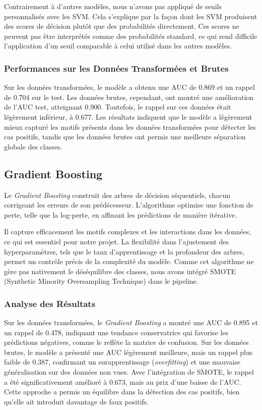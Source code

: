\documentclass[a4paper,12pt]{report}
\begin{document}
Contrairement à d'autres modèles, nous n'avons pas appliqué de seuils personnalisés avec les SVM. Cela s'explique par la façon dont les SVM produisent des scores de décision plutôt que des probabilités directement. Ces scores ne peuvent pas être interprétés comme des probabilités standard, ce qui rend difficile l'application d'un seuil comparable à celui utilisé dans les autres modèles.

\subsubsection{Performances sur les Données Transformées et Brutes}

Sur les données transformées, le modèle a obtenu une AUC de 0.869 et un rappel de 0.704 sur le test. Les données brutes, cependant, ont montré une amélioration de l'AUC test, atteignant 0.900. Toutefois, le rappel sur ces données était légèrement inférieur, à 0.677. Les résultats indiquent que le modèle a légèrement mieux capturé les motifs présents dans les données transformées pour détecter les cas positifs, tandis que les données brutes ont permis une meilleure séparation globale des classes.

\subsection{Gradient Boosting}

Le \textit{Gradient Boosting} construit des arbres de décision séquentiels, chacun corrigeant les erreurs de son prédécesseur. L’algorithme optimise une fonction de perte, telle que la log-perte, en affinant les prédictions de manière itérative.

Il capture efficacement les motifs complexes et les interactions dans les données, ce qui est essentiel pour notre projet. La flexibilité dans l’ajustement des hyperparamètres, tels que le taux d’apprentissage et la profondeur des arbres, permet un contrôle précis de la complexité du modèle. Comme cet algorithme ne gère pas nativement le déséquilibre des classes, nous avons intégré SMOTE (Synthetic Minority Oversampling Technique) dans le pipeline.

\subsubsection{Analyse des Résultats}

Sur les données transformées, le \textit{Gradient Boosting} a montré une AUC de 0.895 et un rappel de 0.478, indiquant une tendance conservatrice qui favorise les prédictions négatives, comme le reflète la matrice de confusion. Sur les données brutes, le modèle a présenté une AUC légèrement meilleure, mais un rappel plus faible de 0.387, confirmant un surapprentissage (\textit{overfitting}) et une mauvaise généralisation sur des données non vues. Avec l’intégration de SMOTE, le rappel a été significativement amélioré à 0.673, mais au prix d'une baisse de l’AUC. Cette approche a permis un équilibre dans la détection des cas positifs, bien qu’elle ait introduit davantage de faux positifs.
\end{document}
